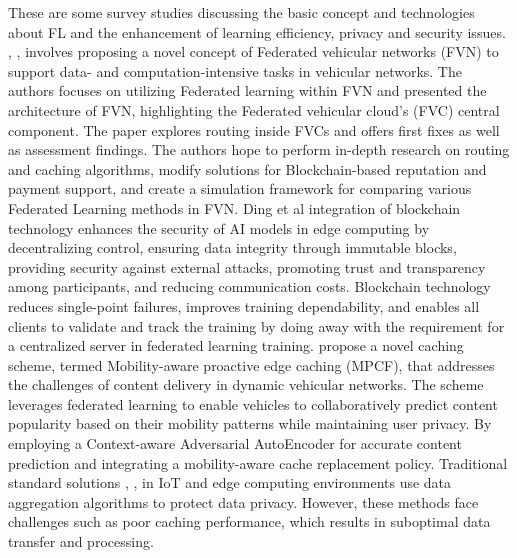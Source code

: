 \documentclass[journal]{IEEEtran}
\begin{document}
These are some survey studies discussing the basic concept and technologies about FL and the enhancement of learning efficiency, privacy and security issues.  \cite{r13}, \cite{r14}, \cite{r15} involves proposing a novel concept of Federated vehicular networks (FVN) to support data- and computation-intensive tasks in vehicular networks. The authors focuses on utilizing Federated learning within FVN and presented the architecture of FVN, highlighting the Federated vehicular cloud's (FVC) central component. The paper explores routing inside FVCs and offers first fixes as well as assessment findings. The authors hope to perform in-depth research on routing and caching algorithms, modify solutions for Blockchain-based reputation and payment support, and create a simulation framework for comparing various Federated Learning methods in FVN. 
\cite{r16} Ding et al integration of blockchain technology enhances the security of AI models in edge computing by decentralizing control, ensuring data integrity through immutable blocks, providing security against external attacks, promoting trust and transparency among participants, and reducing communication costs. Blockchain technology reduces single-point failures, improves training dependability, and enables all clients to validate and track the training by doing away with the requirement for a centralized server in federated learning training. \cite{r17} propose a novel caching scheme, termed Mobility-aware proactive edge caching (MPCF), that addresses the challenges of content delivery in dynamic vehicular networks. The scheme leverages federated learning to enable vehicles to collaboratively predict content popularity based on their mobility patterns while maintaining user privacy. By employing a Context-aware Adversarial AutoEncoder for accurate content prediction and integrating a mobility-aware cache replacement policy. 
Traditional standard solutions \cite{r20}, \cite{r21}, \cite{r21_1} in IoT and edge computing environments use data aggregation algorithms to protect data privacy. However, these methods face challenges such as poor caching performance, which results in suboptimal data transfer and processing. \par
\end{document}
